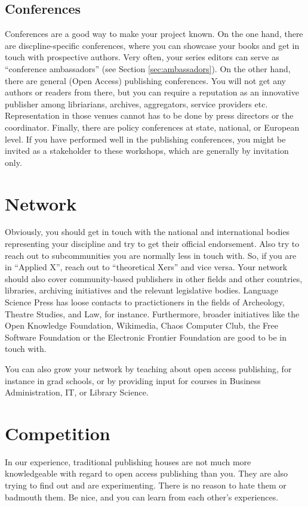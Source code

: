 \documentclass[guidelines,nonflat,modfonts] {langsci/langscibook}
\begin{document}
\subsection{Conferences}
Conferences are a good way to make your project known. On the one hand, there are discpline-specific conferences, where you can showcase your books and get in touch with prospective authors. Very often, your series editors can serve as ``conference ambassadors'' (see Section \ref{sec:ambassadors}). On the other hand, there are general (Open Access) publishing conferences. You will not get any authors or readers from there, but you can require a reputation as an innovative publisher among libriarians, archives, aggregators, service providers etc. Representation in those venues cannot has to be done by press directors or the coordinator. Finally, there are policy conferences at state, national, or European level. If you have performed well in the publishing conferences, you might be invited as a stakeholder to these workshops, which are generally by invitation only. 

\section{Network}
Obviously, you should get in touch with the national and international bodies representing your discipline and try to get their official endorsement. Also try to reach out to subcommunities you are normally less in touch with. So, if you are in ``Applied X'', reach out to ``theoretical Xers'' and vice versa. Your network should also cover community-based publishers in other fields and other countries, libraries, archiving initiatives and the relevant legislative bodies. Language Science Press has loose contacts to practictioners in the fields of Archeology, Theatre Studies, and Law, for instance. 
Furthermore, broader initiatives like the Open Knowledge Foundation, Wikimedia, Chaos Computer Club, the Free Software Foundation or the Electronic Frontier Foundation are good to be in touch with.

You can also grow your network by teaching about open access publishing, for instance in grad schools, or by providing input for courses in Business Administration, IT, or Library Science. 

\section{Competition}
In our experience, traditional publishing houses are not much more knowledgeable with regard to open access publishing than you. They are also trying to find out and are experimenting. There is no reason to hate them or badmouth them. Be nice, and you can learn from each other's experiences. 
\end{document}
